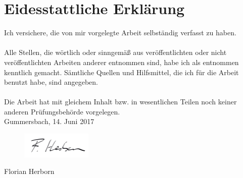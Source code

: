 \chapter*{Eidesstattliche Erklärung}
Ich versichere, die von mir vorgelegte Arbeit selbständig verfasst zu haben.\\ \\
Alle Stellen, die wörtlich oder sinngemäß aus veröffentlichten oder nicht veröffentlichten Arbeiten anderer entnommen sind, habe ich als entnommen kenntlich gemacht. Sämtliche Quellen und Hilfsmittel, die ich für die Arbeit benutzt habe, sind angegeben.\\ \\
Die Arbeit hat mit gleichem Inhalt bzw. in wesentlichen Teilen noch keiner anderen Prüfungsbehörde vorgelegen.
\vspace{1.5cm}
\\
Gummersbach, 14. Juni 2017\\
\begin{figure}[!htb]
		\includegraphics[width=0.3\textwidth]{images/Unterschrift.pdf}
\end{figure}

Florian Herborn



